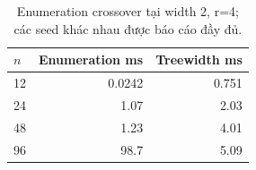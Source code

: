 \begin{table}[htbp]
\centering
\small
\setlength{\tabcolsep}{4pt}
\caption{Enumeration crossover tại width 2, r=4; các seed khác nhau được báo cáo đầy đủ.}
\label{tab:enumeration-crossover}
\begin{tabular}{lrr}
\toprule
$n$ & Enumeration ms & Treewidth ms \\
\midrule
12 & 0.0242 & 0.751 \\
24 & 1.07 & 2.03 \\
48 & 1.23 & 4.01 \\
96 & 98.7 & 5.09 \\
\bottomrule
\end{tabular}
\end{table}
